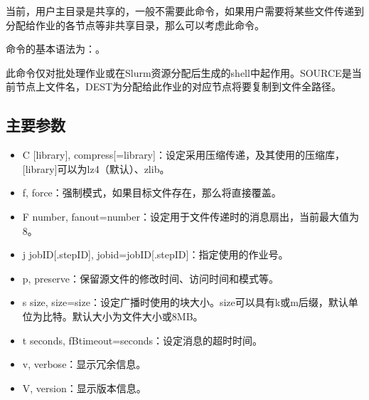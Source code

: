 \documentclass[a4paper,12pt,english]{sphinxmanual}
\begin{document}
\sphinxAtStartPar
当前，用户主目录是共享的，一般不需要此命令，如果用户需要将某些文件传递到分配给作业的各节点等非共享目录，那么可以考虑此命令。

\sphinxAtStartPar
{}命令的基本语法为：。

\sphinxAtStartPar
此命令仅对批处理作业或在Slurm资源分配后生成的shell中起作用。SOURCE是当前节点上文件名，DEST为分配给此作业的对应节点将要复制到文件全路径。


\subsection{主要参数}
\label{\detokenize{slurm/slurm:id37}}\label{\detokenize{slurm/slurm:id38}}\begin{itemize}
\item {} 
\sphinxAtStartPar
\sphinxhyphen{}C {[}library{]},
\sphinxhyphen{}\sphinxhyphen{}compress{[}=library{]}：设定采用压缩传递，及其使用的压缩库，{[}library{]}可以为lz4（默认）、zlib。

\item {} 
\sphinxAtStartPar
\sphinxhyphen{}f, \sphinxhyphen{}\sphinxhyphen{}force：强制模式，如果目标文件存在，那么将直接覆盖。

\item {} 
\sphinxAtStartPar
\sphinxhyphen{}F number,
\sphinxhyphen{}\sphinxhyphen{}fanout=number：设定用于文件传递时的消息扇出，当前最大值为8。

\item {} 
\sphinxAtStartPar
\sphinxhyphen{}j jobID{[}.stepID{]}, \sphinxhyphen{}\sphinxhyphen{}jobid=jobID{[}.stepID{]}：指定使用的作业号。

\item {} 
\sphinxAtStartPar
\sphinxhyphen{}p, \sphinxhyphen{}\sphinxhyphen{}preserve：保留源文件的修改时间、访问时间和模式等。

\item {} 
\sphinxAtStartPar
\sphinxhyphen{}s size,
\sphinxhyphen{}\sphinxhyphen{}size=size：设定广播时使用的块大小。size可以具有k或m后缀，默认单位为比特。默认大小为文件大小或8MB。

\item {} 
\sphinxAtStartPar
\sphinxhyphen{}t seconds, fB\sphinxhyphen{}\sphinxhyphen{}timeout=seconds：设定消息的超时时间。

\item {} 
\sphinxAtStartPar
\sphinxhyphen{}v, \sphinxhyphen{}\sphinxhyphen{}verbose：显示冗余信息。

\item {} 
\sphinxAtStartPar
\sphinxhyphen{}V, \sphinxhyphen{}\sphinxhyphen{}version：显示版本信息。

\end{itemize}
\end{document}
